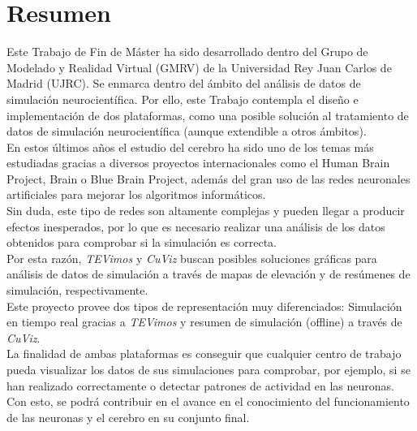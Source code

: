 \chapter{Resumen} \label{chapter:resumen}
Este Trabajo de Fin de Máster ha sido desarrollado dentro del Grupo de Modelado y Realidad Virtual (GMRV) de la Universidad Rey Juan Carlos de Madrid (UJRC). Se enmarca dentro del ámbito del análisis de datos de simulación neurocientífica. Por ello, este Trabajo contempla el diseño e implementación de dos plataformas, como una posible solución al tratamiento de datos de simulación neurocientífica (aunque extendible a otros ámbitos).\\
En estos últimos años el estudio del cerebro ha sido uno de los temas más estudiadas gracias a diversos proyectos internacionales como el Human Brain Project, Brain o Blue Brain Project, además del gran uso de las redes neuronales artificiales para mejorar los algoritmos informáticos.\\
Sin duda, este tipo de redes son altamente complejas y pueden llegar a producir efectos inesperados, por lo que es necesario realizar una análisis de los datos obtenidos para comprobar si la simulación es correcta.\\
Por esta razón, \textit{TEVimos} y \textit{CuViz} buscan posibles soluciones gráficas para análisis de datos de simulación a través de mapas de elevación y de resúmenes de simulación, respectivamente.\\
Este proyecto provee dos tipos de representación muy diferenciados: Simulación en tiempo real gracias a \textit{TEVimos} y resumen de simulación (offline) a través de \textit{CuViz}.\\
La finalidad de ambas plataformas es conseguir que cualquier centro de trabajo pueda visualizar los datos de sus simulaciones para comprobar, por ejemplo, si se han realizado correctamente o detectar patrones de actividad en las neuronas. Con esto, se podrá contribuir en el avance en el conocimiento del funcionamiento de las neuronas y el cerebro en su conjunto final.